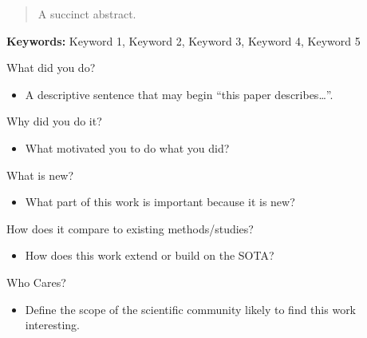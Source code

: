\documentclass{rcclab}
\begin{document}
\maketitle

\begin{abstract}

A succinct abstract.

\end{abstract}

\textbf{Keywords:} Keyword 1, Keyword 2, Keyword 3, Keyword 4, Keyword 5

%
%

\begin{outline}

    \item What did you do?
    \begin{itemize}
        \item A descriptive sentence that may begin ``this paper describes\dots''.      
    \end{itemize}
    
    \item Why did you do it?
    \begin{itemize}
        \item What motivated you to do what you did?
    \end{itemize}
    
        \item What is new?
    \begin{itemize}
        \item What part of this work is important because it is new?
    \end{itemize}
    
        \item How does it compare to existing methods/studies?
    \begin{itemize}
        \item How does this work extend or build on the SOTA? 
    \end{itemize}
    
        \item Who Cares?
    \begin{itemize}
        \item Define the scope of the scientific community likely to find this work interesting.
    \end{itemize}
    
\end{outline}
\end{document}
